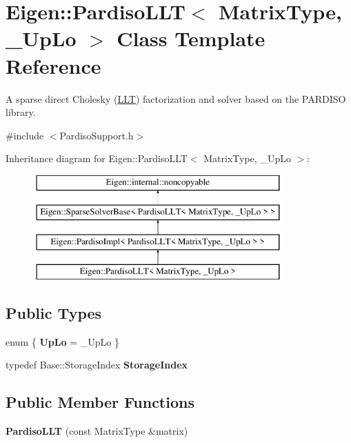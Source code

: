 \hypertarget{class_eigen_1_1_pardiso_l_l_t}{}\section{Eigen\+::Pardiso\+L\+LT$<$ Matrix\+Type, \+\_\+\+Up\+Lo $>$ Class Template Reference}
\label{class_eigen_1_1_pardiso_l_l_t}


A sparse direct Cholesky (\mbox{\hyperlink{class_eigen_1_1_l_l_t}{L\+LT}}) factorization and solver based on the P\+A\+R\+D\+I\+SO library.  




{\ttfamily \#include $<$Pardiso\+Support.\+h$>$}

Inheritance diagram for Eigen\+::Pardiso\+L\+LT$<$ Matrix\+Type, \+\_\+\+Up\+Lo $>$\+:\begin{figure}[H]
\begin{center}
\leavevmode
\includegraphics[height=4.000000cm]{class_eigen_1_1_pardiso_l_l_t}
\end{center}
\end{figure}
\subsection*{Public Types}
\begin{DoxyCompactItemize}
\item 
\mbox{\label{class_eigen_1_1_pardiso_l_l_t_a0e57b5f8cdbf9d45427d584d34494403}} 
enum \{ {\bfseries Up\+Lo} = \+\_\+\+Up\+Lo
 \}
\item 
\mbox{\label{class_eigen_1_1_pardiso_l_l_t_a829a43ab724a0b622adccc2101016261}} 
typedef Base\+::\+Storage\+Index {\bfseries Storage\+Index}
\end{DoxyCompactItemize}
\subsection*{Public Member Functions}
\begin{DoxyCompactItemize}
\item 
\mbox{\label{class_eigen_1_1_pardiso_l_l_t_a001cc4fc6bc3d11bf0d18fb8950029fe}} 
{\bfseries Pardiso\+L\+LT} (const Matrix\+Type \&matrix)
\end{DoxyCompactItemize}
